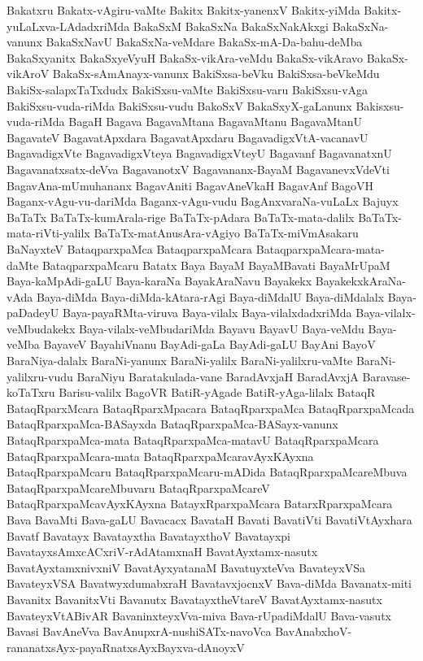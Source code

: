 {Bakatxru
Bakatx-vAgiru-vaMte
Bakitx
Bakitx-yanenxV
Bakitx-yiMda
Bakitx-yuLaLxva-LAdadxriMda
BakaSxM
BakaSxNa
BakaSxNakAkxgi
BakaSxNa-vanunx
BakaSxNavU
BakaSxNa-veMdare
BakaSx-mA-Da-bahu-deMba
BakaSxyanitx
BakaSxyeVyuH
BakaSx-vikAra-veMdu
BakaSx-vikAravo
BakaSx-vikAroV
BakaSx-sAmAnayx-vanunx
BakiSxsa-beVku
BakiSxsa-beVkeMdu
BakiSx-salapxTaTxdudx
BakiSxsu-vaMte
BakiSxsu-varu
BakiSxsu-vAga
BakiSxsu-vuda-riMda
BakiSxsu-vudu
BakoSxV
BakaSxyX-gaLanunx
Bakisxsu-vuda-riMda
BagaH
Bagava
BagavaMtana
BagavaMtanu
BagavaMtanU
BagavateV
BagavatApxdara
BagavatApxdaru
BagavadigxVtA-vacanavU
BagavadigxVte
BagavadigxVteya
BagavadigxVteyU
Bagavanf
BagavanatxnU
Bagavanatxsatx-deVva
BagavanotxV
Bagavananx-BayaM
BagavanevxVdeVti
BagavAna-mUmuhananx
BagavAniti
BagavAneVkaH
BagavAnf
BagoVH
Baganx-vAgu-vu-dariMda
Baganx-vAgu-vudu
BagAnxvaraNa-vuLaLx
Bajuyx
BaTaTx
BaTaTx-kumArala-rige
BaTaTx-pAdara
BaTaTx-mata-dalilx
BaTaTx-mata-riVti-yalilx
BaTaTx-matAnusAra-vAgiyo
BaTaTx-miVmAsakaru
BaNayxteV
BataqparxpaMca
BataqparxpaMcara
BataqparxpaMcara-mata-daMte
BataqparxpaMcaru
Batatx
Baya
BayaM
BayaMBavati
BayaMrUpaM
Baya-kaMpAdi-gaLU
Baya-karaNa
BayakAraNavu
Bayakekx
BayakekxkAraNa-vAda
Baya-diMda
Baya-diMda-kAtara-rAgi
Baya-diMdalU
Baya-diMdalalx
Baya-paDadeyU
Baya-payaRMta-viruva
Baya-vilalx
Baya-vilalxdadxriMda
Baya-vilalx-veMbudakekx
Baya-vilalx-veMbudariMda
Bayavu
BayavU
Baya-veMdu
Baya-veMba
BayaveV
BayahiVnanu
BayAdi-gaLa
BayAdi-gaLU
BayAni
BayoV
BaraNiya-dalalx
BaraNi-yanunx
BaraNi-yalilx
BaraNi-yalilxru-vaMte
BaraNi-yalilxru-vudu
BaraNiyu
Baratakulada-vane
BaradAvxjaH
BaradAvxjA
Baravase-koTaTxru
Barisu-valilx
BagoVR
BatiR-yAgade
BatiR-yAga-lilalx
BataqR
BataqRparxMcara
BataqRparxMpacara
BataqRparxpaMca
BataqRparxpaMcada
BataqRparxpaMca-BASayxda
BataqRparxpaMca-BASayx-vanunx
BataqRparxpaMca-mata
BataqRparxpaMca-matavU
BataqRparxpaMcara
BataqRparxpaMcara-mata
BataqRparxpaMcaravAyxKAyxna
BataqRparxpaMcaru
BataqRparxpaMcaru-mADida
BataqRparxpaMcareMbuva
BataqRparxpaMcareMbuvaru
BataqRparxpaMcareV
BataqRparxpaMcavAyxKAyxna
BatayxRparxpaMcara
BatarxRparxpaMcara
Bava
BavaMti
Bava-gaLU
Bavacacx
BavataH
Bavati
BavatiVti
BavatiVtAyxhara
Bavatf
Bavatayx
Bavatayxtha
BavatayxthoV
Bavatayxpi
BavatayxsAmxcACxriV-rAdAtamxnaH
BavatAyxtamx-nasutx
BavatAyxtamxnivxniV
BavatAyxyatanaM
BavatuyxteVva
BavateyxVSa
BavateyxVSA
BavatwyxdumabxraH
BavatavxjocnxV
Bava-diMda
Bavanatx-miti
Bavanitx
BavanitxVti
Bavanutx
BavatayxtheVtareV
BavatAyxtamx-nasutx
BavateyxVtABivAR
BavaninxteyxVva-miva
Bava-rUpadiMdalU
Bava-vasutx
Bavasi
BavAneVva
BavAnupxrA-nushiSATx-navoVca
BavAnabxhoV-rananatxsAyx-payaRnatxsAyxBayxva-dAnoyxV
}
